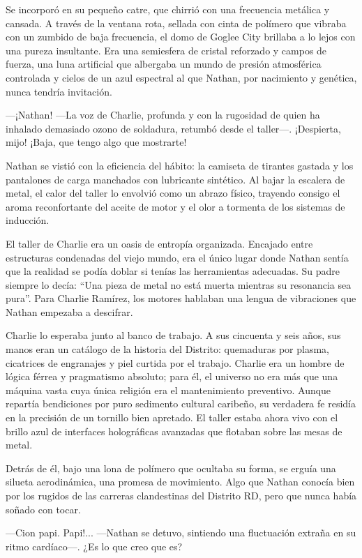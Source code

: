 \documentclass[11pt,twoside]{book}
\begin{document}
Se incorporó en su pequeño catre, que chirrió con una frecuencia metálica y cansada. A través de la ventana rota, sellada con cinta de polímero que vibraba con un zumbido de baja frecuencia, el domo de Goglee City brillaba a lo lejos con una pureza insultante. Era una semiesfera de cristal reforzado y campos de fuerza, una luna artificial que albergaba un mundo de presión atmosférica controlada y cielos de un azul espectral al que Nathan, por nacimiento y genética, nunca tendría invitación.

---¡Nathan! ---La voz de Charlie, profunda y con la rugosidad de quien ha inhalado demasiado ozono de soldadura, retumbó desde el taller---. ¡Despierta, mijo! ¡Baja, que tengo algo que mostrarte!

Nathan se vistió con la eficiencia del hábito: la camiseta de tirantes gastada y los pantalones de carga manchados con lubricante sintético. Al bajar la escalera de metal, el calor del taller lo envolvió como un abrazo físico, trayendo consigo el aroma reconfortante del aceite de motor y el olor a tormenta de los sistemas de inducción.

El taller de Charlie era un oasis de entropía organizada. Encajado entre estructuras condenadas del viejo mundo, era el único lugar donde Nathan sentía que la realidad se podía doblar si tenías las herramientas adecuadas. Su padre siempre lo decía: ``Una pieza de metal no está muerta mientras su resonancia sea pura''. Para Charlie Ramírez, los motores hablaban una lengua de vibraciones que Nathan empezaba a descifrar.

Charlie lo esperaba junto al banco de trabajo. A sus cincuenta y seis años, sus manos eran un catálogo de la historia del Distrito: quemaduras por plasma, cicatrices de engranajes y piel curtida por el trabajo. Charlie era un hombre de lógica férrea y pragmatismo absoluto; para él, el universo no era más que una máquina vasta cuya única religión era el mantenimiento preventivo. Aunque repartía bendiciones por puro sedimento cultural caribeño, su verdadera fe residía en la precisión de un tornillo bien apretado. El taller estaba ahora vivo con el brillo azul de interfaces holográficas avanzadas que flotaban sobre las mesas de metal.

Detrás de él, bajo una lona de polímero que ocultaba su forma, se erguía una silueta aerodinámica, una promesa de movimiento. Algo que Nathan conocía bien por los rugidos de las carreras clandestinas del Distrito RD, pero que nunca había soñado con tocar.

---Cion papi. Papi!... ---Nathan se detuvo, sintiendo una fluctuación extraña en su ritmo cardíaco---. ¿Es lo que creo que es?
\end{document}
